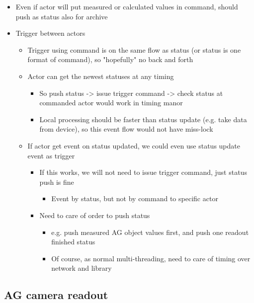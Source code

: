 \documentclass[a4paper,notitlepage]{article}
\begin{document}
\begin{itemize}
  \item Even if actor will put measured or calculated values in command, should push as status also for archive
  \item Trigger between actors
  \begin{itemize}
    \item Trigger using command is on the same flow as status (or status is one format of command), so "hopefully" no back and forth
    \item Actor can get the newest statuses at any timing
    \begin{itemize}
      \item So push status -> issue trigger command -> check status at commanded actor would work in timing manor
      \item Local processing should be faster than status update (e.g. take data from device), so this event flow would not have miss-lock
    \end{itemize}
    \item If actor get event on status updated, we could even use status update event as trigger
    \begin{itemize}
      \item If this works, we will not need to issue trigger command, just status push is fine
      \begin{itemize}
        \item Event by status, but not by command to specific actor
      \end{itemize}
      \item Need to care of order to push status
      \begin{itemize}
        \item e.g. push measured AG object values first, and push one readout finished status
        \item Of course, as normal multi-threading, need to care of timing over network and library
      \end{itemize}
    \end{itemize}
  \end{itemize}
\end{itemize}

\subsection{AG camera readout}
\end{document}

